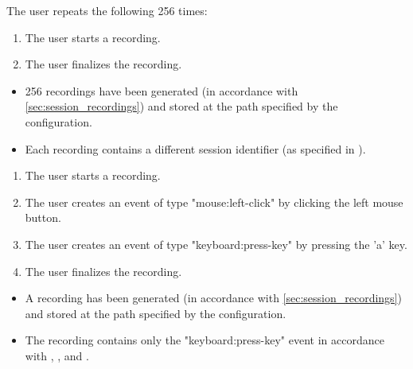 \begin{tests}
    {The \gls{user} repeats the following 256 times:
    \begin{enumerate}
        \item The \gls{user} starts a recording.
        \item The \gls{user} finalizes the recording.
    \end{enumerate}}
    {\begin{itemize}
        \item 256 recordings have been generated (in accordance with \ref{sec:session_recordings}) and stored at the path specified by the configuration.
        \item Each recording contains a different \gls{session} identifier (as specified in ).
    \end{itemize}}

    {\begin{enumerate}
        \item The \gls{user} starts a recording.
        \item The \gls{user} creates an \gls{event} of type "mouse:left-click" by clicking the left mouse button.
        \item The \gls{user} creates an \gls{event} of type "keyboard:press-key" by pressing the 'a' key.
        \item The \gls{user} finalizes the recording.
    \end{enumerate}}
    {\begin{itemize}
        \item A recording has been generated (in accordance with \ref{sec:session_recordings}) and stored at the path specified by the configuration.
        \item The recording contains only the "keyboard:press-key" \gls{event} in accordance with , ,  and .
    \end{itemize}}


\end{tests}
